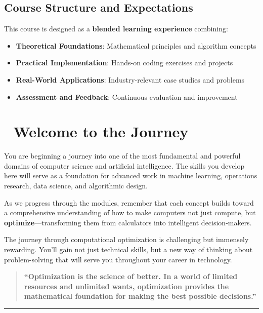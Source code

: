 \documentclass[
  letterpaper,
  DIV=11,
  numbers=noendperiod]{scrreprt}
\providecommand{\tightlist}{%
  \setlength{\itemsep}{0pt}\setlength{\parskip}{0pt}}
\begin{document}
\subsection{Course Structure and
Expectations}\label{course-structure-and-expectations}

This course is designed as a \textbf{blended learning experience}
combining:

\begin{itemize}
\tightlist
\item
  \textbf{Theoretical Foundations}: Mathematical principles and
  algorithm concepts
\item
  \textbf{Practical Implementation}: Hands-on coding exercises and
  projects
\item
  \textbf{Real-World Applications}: Industry-relevant case studies and
  problems
\item
  \textbf{Assessment and Feedback}: Continuous evaluation and
  improvement
\end{itemize}

\section{🌟 Welcome to the Journey}\label{welcome-to-the-journey}

You are beginning a journey into one of the most fundamental and
powerful domains of computer science and artificial intelligence. The
skills you develop here will serve as a foundation for advanced work in
machine learning, operations research, data science, and algorithmic
design.

As we progress through the modules, remember that each concept builds
toward a comprehensive understanding of how to make computers not just
compute, but \textbf{optimize}---transforming them from calculators into
intelligent decision-makers.

The journey through computational optimization is challenging but
immensely rewarding. You'll gain not just technical skills, but a new
way of thinking about problem-solving that will serve you throughout
your career in technology.

\begin{quote}
\textbf{``Optimization is the science of better. In a world of limited
resources and unlimited wants, optimization provides the mathematical
foundation for making the best possible decisions.''}
\end{quote}

\begin{center}\rule{0.5\linewidth}{0.5pt}\end{center}
\end{document}
